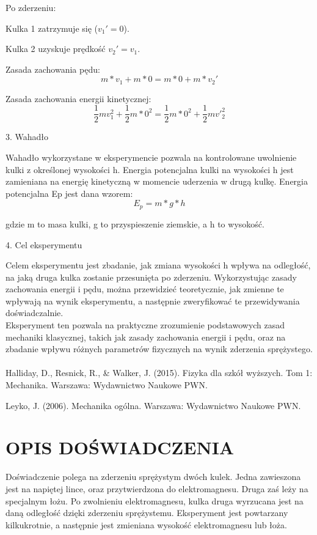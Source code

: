 \documentclass{article}
\begin{document}
{Po zderzeniu:

    Kulka 1 zatrzymuje się ($v_1′=0$).

    Kulka 2 uzyskuje prędkość $v_2′=v_1$.

Zasada zachowania pędu:
\[m*v_1+m*0=m*0+m*v_2′\]

Zasada zachowania energii kinetycznej:
\[ \frac12mv_{1}^2+\frac12m*0^2=\frac12m*0^2+\frac12mv′_{2}^2 \]

3. Wahadło

Wahadło wykorzystane w eksperymencie pozwala na kontrolowane uwolnienie kulki z określonej wysokości h. Energia potencjalna kulki na wysokości h jest zamieniana na energię kinetyczną w momencie uderzenia w drugą kulkę. Energia potencjalna Ep jest dana wzorem:
\[E_p=m*g*h\]

gdzie m to masa kulki, g to przyspieszenie ziemskie, a h to wysokość.

4. Cel eksperymentu

Celem eksperymentu jest zbadanie, jak zmiana wysokości h wpływa na odległość, na jaką druga kulka zostanie przesunięta po zderzeniu. Wykorzystując zasady zachowania energii i pędu, można przewidzieć teoretycznie, jak zmienne te wpływają na wynik eksperymentu, a następnie zweryfikować te przewidywania doświadczalnie. \\

Eksperyment ten pozwala na praktyczne zrozumienie podstawowych zasad mechaniki klasycznej, takich jak zasady zachowania energii i pędu, oraz na zbadanie wpływu różnych parametrów fizycznych na wynik zderzenia sprężystego.\\
\textbf{} \\
    Halliday, D., Resnick, R., \& Walker, J. (2015). Fizyka dla szkół wyższych. Tom 1: Mechanika. Warszawa: Wydawnictwo Naukowe PWN.

    Leyko, J. (2006). Mechanika ogólna. Warszawa: Wydawnictwo Naukowe PWN.}

\centering

\section*{OPIS DOŚWIADCZENIA}

{Doświadczenie polega na zderzeniu sprężystym dwóch kulek. Jedna zawieszona jest na napiętej lince, oraz przytwierdzona do elektromagnesu. Druga zaś leży na specjalnym łożu. Po zwolnieniu elektromagnesu, kulka druga wyrzucana jest na daną odległość dzięki zderzeniu sprężystemu. Eksperyment jest powtarzany kilkukrotnie, a następnie jest zmieniana wysokość elektromagnesu lub łoża.}
\end{document}
